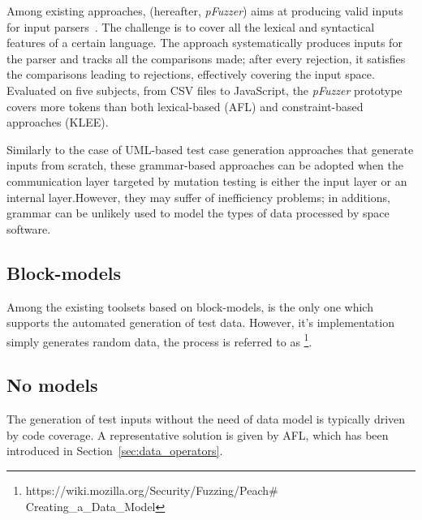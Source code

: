 %
%



Among existing approaches,  (hereafter, \emph{pFuzzer}) aims at producing valid inputs for input parsers~\cite{mathis2019parser}. The challenge is to cover all the lexical and syntactical features of a certain language. The approach systematically produces inputs for the parser and tracks all the comparisons made; after every rejection, it satisfies the comparisons leading to rejections, effectively covering the input space. 
Evaluated on five subjects, from CSV files to JavaScript, the \emph{pFuzzer} prototype covers more tokens than both lexical-based (AFL) and constraint-based approaches (KLEE).


Similarly to the case of UML-based test case generation approaches that generate inputs from scratch, these grammar-based approaches can be adopted when the communication layer targeted by mutation testing is either the input layer or an internal layer.However, they may suffer of inefficiency problems; in additions, grammar can be unlikely used to model the types of data processed by space software.


\subsection{Block-models}

Among the existing toolsets based on block-models,  is the only one which supports the automated generation of test data. However, it's implementation simply generates random data, the process is referred to as 
\footnote{https://wiki.mozilla.org/Security/Fuzzing/Peach$\#$Creating\_a\_Data\_Model}.


\subsection{No models}


The generation of test inputs without the need of data model is typically driven by code coverage. A representative solution is given by AFL, which has been introduced in Section~\ref{sec:data_operators}. 

